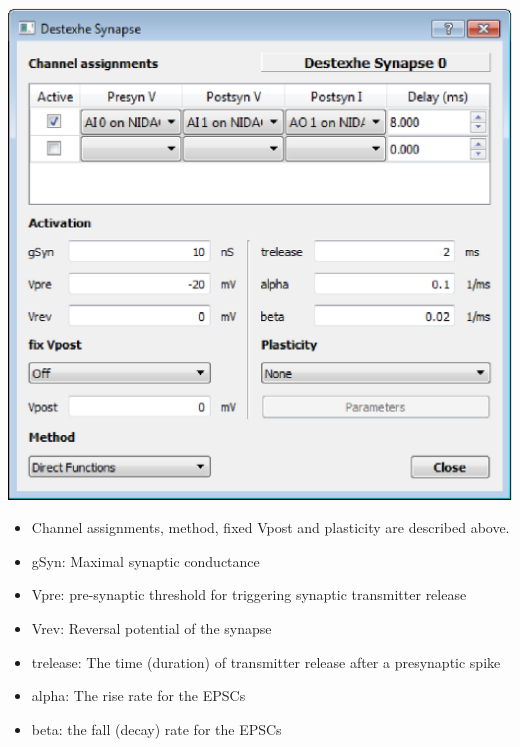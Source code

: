\documentclass{article}
\begin{document}
\noindent
\parbox[b]{0.48\textwidth}{
\includegraphics[scale=0.5]{destexheSynDialog}}
\hfill
\parbox[b]{0.5\textwidth}{
\begin{itemize}
\item Channel assignments, method, fixed Vpost and plasticity are described above.
\item gSyn: Maximal synaptic conductance
\item Vpre: pre-synaptic threshold for triggering synaptic transmitter
  release
\item Vrev: Reversal potential of the synapse
\item trelease: The time (duration) of transmitter release after a
  presynaptic spike
\item alpha: The rise rate for the EPSCs
\item beta: the fall (decay) rate for the EPSCs
\end{itemize}
}\\
\end{document}
